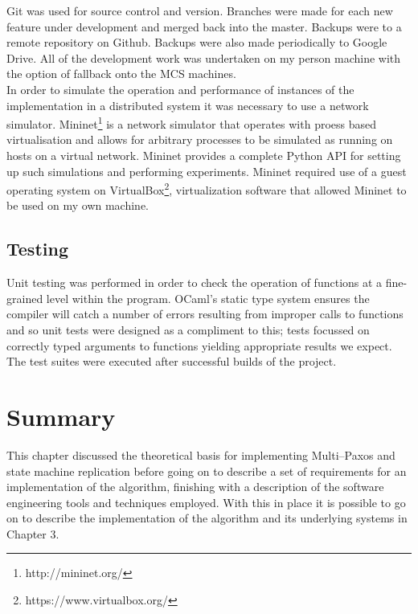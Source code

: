 Git was used for source control and version. Branches were made for each new feature under development and merged back into the master. Backups were to a remote repository on Github. Backups were also made periodically to Google Drive. All of the development work was undertaken on my person machine with the option of fallback onto the MCS machines. \\

In order to simulate the operation and performance of instances of the implementation in a distributed system it was necessary to use a network simulator. Mininet\footnote{http://mininet.org/} is a network simulator that operates with proess based virtualisation and allows for arbitrary processes to be simulated as running on hosts on a virtual network. Mininet provides a complete Python API for setting up such simulations and performing experiments. Mininet required use of a guest operating system on VirtualBox\footnote{https://www.virtualbox.org/}, virtualization software that allowed Mininet to be used on my own machine.

\subsection{Testing}
\label{subsection-testing}
Unit testing was performed in order to check the operation of functions at a fine-grained level within the program. OCaml's static type system ensures the compiler will catch a number of errors resulting from improper calls to functions and so unit tests were designed as a compliment to this; tests focussed on correctly typed arguments to functions yielding appropriate results we expect. The test suites were executed after successful builds of the project.


\section{Summary}
This chapter discussed the theoretical basis for implementing Multi--Paxos and state machine replication before going on to describe a set of requirements for an implementation of the algorithm, finishing with a description of the software engineering tools and techniques employed. With this in place it is possible to go on to describe the implementation of the algorithm and its underlying systems in Chapter 3.





